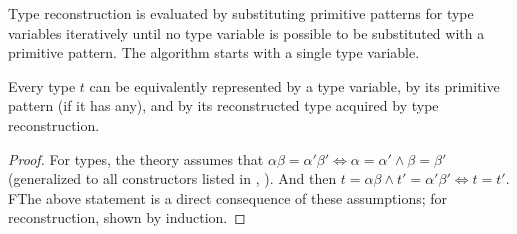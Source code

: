 \begin{defn}
    Type reconstruction is evaluated by substituting primitive patterns for type variables iteratively until no type variable is possible to be substituted with a primitive pattern. The algorithm starts with a single type variable.
\end{defn}

\begin{lemma}
    \label{typesObs}
    Every type $t$ can be equivalently represented by a type variable, by its primitive pattern (if it has any), and by its reconstructed type acquired by type reconstruction.
\end{lemma}

\begin{proof}
    For types, the theory assumes that  $\alpha \beta = \alpha' \beta' \Leftrightarrow \alpha = \alpha' \land \beta = \beta'$  (generalized to all constructors listed in , ). And then $t = \alpha \beta \land t' = \alpha' \beta' \Leftrightarrow t = t'$. FThe above statement is a direct consequence of these assumptions; for reconstruction, shown by induction.
\end{proof}

